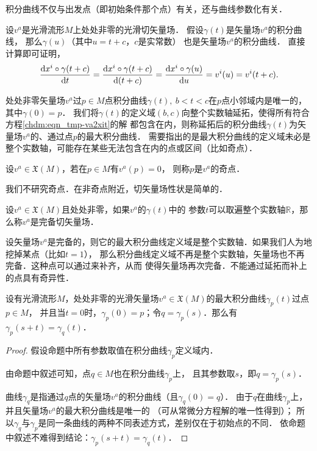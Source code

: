 积分曲线不仅与出发点（即初始条件那个点）有关，还与曲线参数化有关．
\begin{example}
    设$v^a$是光滑流形$M$上处处非零的光滑切矢量场．
    假设$\gamma(t)$是矢量场$v^a$的积分曲线，
    那么$\gamma(u)$（其中$u=t+c$，$c$是实常数）
    也是矢量场$v^a$的积分曲线．
直接计算即可证明，
    \begin{equation}
        \frac{{\rm d} x^i\circ\gamma(t+c)}{{\rm d} t} = 
        \frac{{\rm d} x^i\circ\gamma(t+c)}{{\rm d} (t+c)}=
        \frac{{\rm d} x^i\circ\gamma(u)}{{\rm d} u}=v^i(u)=v^i(t+c).
    \end{equation}
\end{example}

处处非零矢量场$v^a$过$p\in M$点积分曲线$\gamma(t),\ b<t<c$在$p$点小邻域内是唯一的，其中$\gamma(0)=p$．
我们将$\gamma(t)$的定义域$(b,c)$向整个实数轴延拓，使得所有符合方程\eqref{chdm:eqn_tmp-va2xit}的解
都包含在内，则称延拓后的积分曲线$\gamma(t)$为矢量场$v^a$的、通过点$p$的{\heiti 最大积分曲线}．
需要指出的是最大积分曲线的定义域未必是整个实数轴，可能存在某些无法包含在内的点或区间（比如奇点）．

\begin{definition}
    设$v^a \in \mathfrak{X}(M)$，若在$p\in M$有$v^a(p)=0$，
    则称$p$是$v^a$的{\heiti 奇点}．
\end{definition}
我们不研究奇点．在非奇点附近，切矢量场性状是简单的．


\begin{definition}\label{chdm:def_vector-complete}
    设$v^a \in \mathfrak{X}(M)$且处处非零，如果$v^a$的$\gamma(t)$中的
    参数$t$可以取遍整个实数轴$\mathbb{R}$，那么称$v^a$是{\heiti 完备}切矢量场．
\end{definition}

设矢量场$v^a$是完备的，则它的最大积分曲线定义域是整个实数轴．如果我们人为地挖掉某点（比如$t=1$），
那么积分曲线定义域不再是整个实数轴，矢量场也不再完备．这种点可以通过来补齐，从而
使得矢量场再次完备．不能通过延拓而补上的点具有奇异性．

\begin{proposition}\label{chdm:thm_st}
    设有光滑流形$M$，处处非零的光滑矢量场$v^a\in \mathfrak{X}(M)$的最大积分曲线$\gamma_p(t)$过点$p \in M$，
    并且当$t=0$时，$\gamma_p(0)=p$；令$q=\gamma_p(s)$．那么有$\gamma_p(s+t)=\gamma_q(t)$．
\end{proposition}
\begin{proof}
    假设命题中所有参数取值在积分曲线$\gamma_p$定义域内．
    
    由命题中叙述可知，点$q\in M$也在积分曲线$\gamma_p$上，
    且其参数取$s$，即$q=\gamma_p(s)$．
    
    曲线$\gamma_q$是指通过$q$点的矢量场$v^a$的积分曲线（且$\gamma_q(0)=q$）．
    由于$q$在曲线$\gamma_p$上，并且矢量场$v^a$的最大积分曲线是唯一的
    （可从常微分方程解的唯一性得到）；
    所以$\gamma_q$与$\gamma_p$是同一条曲线的两种不同表述方式，差别仅在于初始点的不同．
    依命题中叙述不难得到结论：$\gamma_p(s+t)=\gamma_q(t)$．
\end{proof}

